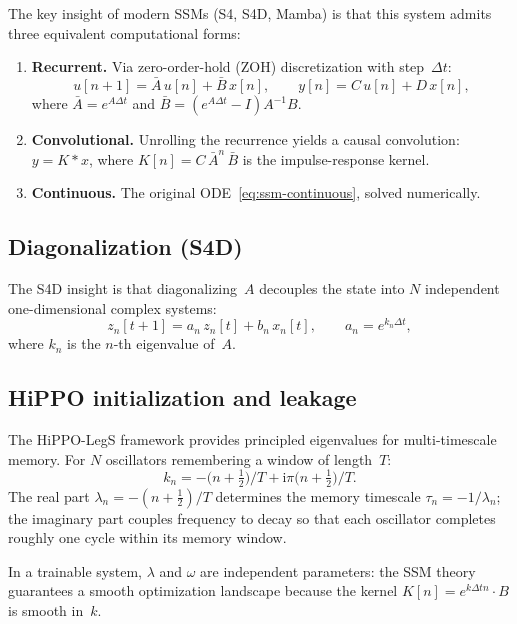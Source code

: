 \documentclass[11pt]{article}
\newcommand{\im}{\mathrm{i}}
\newcommand{\dt}{\Delta t}
\theoremstyle{definition}
\begin{document}
The key insight of modern SSMs (S4, S4D, Mamba) is that this system admits
three equivalent computational forms:
\begin{enumerate}[nosep]
  \item \textbf{Recurrent.}
    Via zero-order-hold (ZOH) discretization with step~$\dt$:
    \[
      u[n+1] = \bar A\,u[n] + \bar B\,x[n],
      \qquad y[n] = C\,u[n] + D\,x[n],
    \]
    where $\bar A = e^{A\dt}$ and $\bar B = (e^{A\dt}-I)A^{-1}B$.

  \item \textbf{Convolutional.}
    Unrolling the recurrence yields a causal convolution:
    $y = K * x$, where $K[n] = C\,\bar A^n\,\bar B$ is the impulse-response
    kernel.

  \item \textbf{Continuous.}
    The original ODE~\eqref{eq:ssm-continuous}, solved numerically.
\end{enumerate}

\subsection{Diagonalization (S4D)}

The S4D insight is that diagonalizing~$A$ decouples the state into $N$
independent one-dimensional complex systems:
\begin{equation}\label{eq:s4d}
  z_n[t+1] = a_n\,z_n[t] + b_n\,x_n[t],
  \qquad a_n = e^{k_n\dt},
\end{equation}
where $k_n$ is the $n$-th eigenvalue of~$A$.

\subsection{HiPPO initialization and leakage}

The HiPPO-LegS framework provides principled eigenvalues for multi-timescale
memory. For $N$ oscillators remembering a window of length~$T$:
\begin{equation}
  k_n = -\bigl(n+\tfrac{1}{2}\bigr)/T + \im\pi\bigl(n+\tfrac{1}{2}\bigr)/T.
\end{equation}
The real part $\lambda_n = -(n+\tfrac12)/T$ determines the memory timescale
$\tau_n = -1/\lambda_n$; the imaginary part couples frequency to decay so
that each oscillator completes roughly one cycle within its memory window.

In a trainable system, $\lambda$ and $\omega$ are independent parameters:
the SSM theory guarantees a smooth optimization landscape because the kernel
$K[n] = e^{k\dt n}\cdot B$ is smooth in~$k$.
\end{document}
